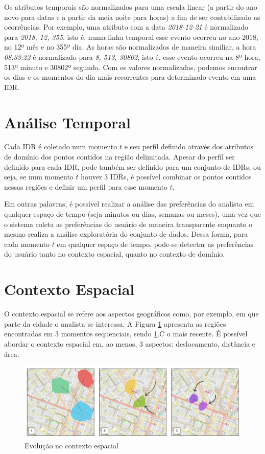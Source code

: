 Os atributos temporais são normalizados para uma escala linear (a partir do ano novo para datas e a partir da meia noite para horas) a fim de ser contabilizado as ocorrências. Por exemplo, uma atributo com a data {\em 2018-12-21} é normalizado para {\em 2018, 12, 355}, isto é, numa linha temporal esse evento ocorreu no ano 2018, no 12º mês e no 355º dia. As horas são normalizados de maneira similiar, a hora {\em 08:33:22} é normalizado para {\em 8, 513, 30802}, isto é, esse evento ocorreu na 8º hora, 513º minuto e 30802º segundo. Com os valores normalizadas, podemos encontrar os dias e os momentos do dia mais recorrentes para determinado evento em uma IDR.


\section{Análise Temporal}

Cada IDR é coletado num momento $t$ e seu perfil definido através dos atributos de domínio dos pontos contidos na região delimitada. Apesar do perfil ser definido para cada IDR, pode também ser definido para um conjunto de IDRs, ou seja, se num momento $t$ houver 3 IDRs, é possível combinar os pontos contidos nessas regiões e definir um perfil para esse momento $t$. 

Em outras palavras, é possível realizar a análise das preferências do analista em qualquer espaço de tempo (seja minutos ou dias, semanas ou meses), uma vez que o sistema coleta as preferências do usuário de maneira transparente enquanto o mesmo realiza a análise exploratória do conjunto de dados. Dessa forma, para cada momento $t$ em qualquer espaço de tempo, pode-se detectar as preferências do usuário tanto no contexto espacial, quanto no contexto de domínio.

\section{Contexto Espacial}

O contexto espacial se refere aos aspectos geográficos como, por exemplo, em que parte da cidade o analista se interessa. A Figura \ref{fig:analise-contexto-espacial} apresenta as regiões encontradas em 3 momentos sequenciais, sendo \ref{fig:analise-contexto-espacial}.C o mais recente. É possível abordar o contexto espacial em, ao menos, 3 aspectos: deslocamento, distância e área.

\begin{figure}[]
	\centering
	\includegraphics[width=\textwidth]{imagens/analise-contexto-espacial}
	\caption{Evolução no contexto espacial}
	\label{fig:analise-contexto-espacial}
\end{figure}


